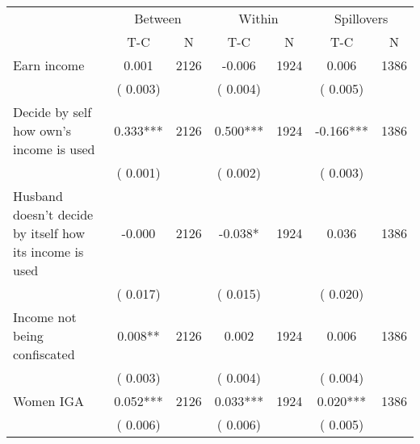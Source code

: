 
\begin{tabular}{l*{6}{c}}\hline&\multicolumn{2}{c}{Between}&\multicolumn{2}{c}{Within}&\multicolumn{2}{c}{Spillovers} \\ \cmidrule(r){2-3}\cmidrule(l){4-5}\cmidrule(l){6-7} & {T-C} & {N} & {T-C} & {N}  & {T-C}  & {N}  \\ \midrule
Earn income        &              0.001      &       2126       &             -0.006      &       1924       &              0.006      &       1386       \\
                       &       (       0.003)            &                               &       (       0.004)            &                               &       (       0.005)            &                               \\
Decide by self how own's income is used        &              0.333***      &       2126       &              0.500***      &       1924       &             -0.166***      &       1386       \\
                       &       (       0.001)            &                               &       (       0.002)            &                               &       (       0.003)            &                               \\
Husband doesn't decide by itself how its income is used        &             -0.000      &       2126       &             -0.038*      &       1924       &              0.036      &       1386       \\
                       &       (       0.017)            &                               &       (       0.015)            &                               &       (       0.020)            &                               \\
Income not being confiscated        &              0.008**      &       2126       &              0.002      &       1924       &              0.006      &       1386       \\
                       &       (       0.003)            &                               &       (       0.004)            &                               &       (       0.004)            &                               \\
Women IGA        &              0.052***      &       2126       &              0.033***      &       1924       &              0.020***      &       1386       \\
                       &       (       0.006)            &                               &       (       0.006)            &                               &       (       0.005)            &                               \\

\end{tabular}

